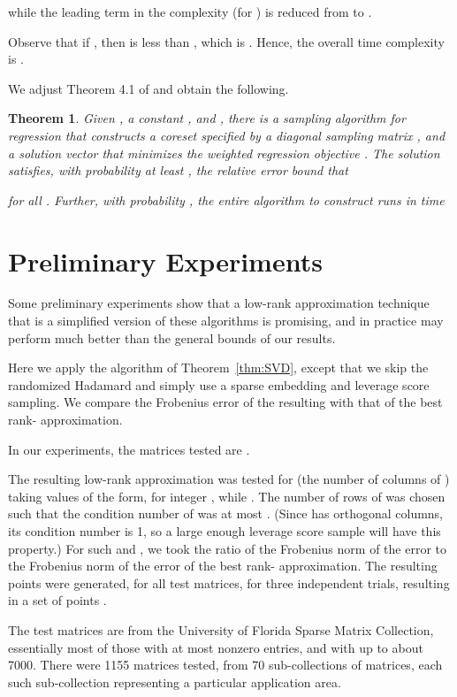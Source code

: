 \documentclass{sig-alternate}
\newtheorem{theorem}{Theorem}
\begin{document}
while the leading term in the complexity (for )
is reduced from  to . 

Observe that if ,
then  is less than , which is . 
Hence, the overall time complexity is . 

We adjust Theorem 4.1 of \cite{ddhkm09} 
and obtain the following.
\fi 

\begin{theorem}\label{thm:lp-running}
Given , a constant , 
 and ,
there is a sampling algorithm for  regression that
constructs a coreset specified by a diagonal sampling matrix , and 
a solution vector  that minimizes the weighted regression objective
.  The solution  satisfies, with probability
at least , the relative error bound that

for all .
Further, with probability
, the entire algorithm to construct   runs in time

\end{theorem}

\ifSTOC\else
\section{Preliminary Experiments}\label{sec:exper}

Some preliminary experiments show that a low-rank approximation technique that is a simplified
version of these algorithms is promising, and in practice may perform much better
than the general bounds of our results.

Here we apply the algorithm of Theorem~\ref{thm:SVD}, except that we skip the
randomized Hadamard and simply use a sparse embedding  
and leverage score sampling. We compare the Frobenius error of the resulting 
with that of the best rank- approximation.

In our experiments, the matrices tested
are .


The resulting low-rank approximation
was tested for  (the number of columns of )
taking values of the form, for integer
, while .
The number  of rows of  was chosen such that the condition number of  was at most . (Since  has orthogonal columns, its condition number is 1, so a large enough leverage
score sample will have this property.)
For such  and , we took the ratio  of the Frobenius norm of the error to the Frobenius norm of the error of the
best rank- approximation. The resulting points  were generated,
for all test matrices, for three independent trials, resulting in a set of points .

The test matrices are from the University of Florida 
Sparse Matrix Collection,
essentially most of those with at most  nonzero entries, and with  up to about  7000.
There were 1155 matrices tested, from 70 sub-collections of matrices, each such
sub-collection representing a particular application area.
\end{document}

